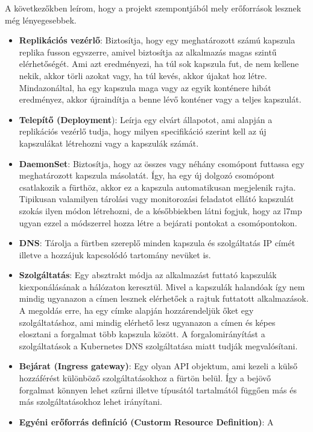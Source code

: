 A következőkben leírom, hogy a projekt szempontjából mely erőforrások lesznek még
lényegesebbek. 

\begin{itemize}
	\item \textbf{Replikációs vezérlő}: Biztosítja, hogy egy meghatározott számú 
	kapszula replika fusson egyszerre, amivel biztosítja az alkalmazás magas szintű
	elérhetőségét. Ami azt eredményezi, ha túl sok kapszula fut, de nem kellene nekik,
	akkor törli azokat vagy, ha túl kevés, akkor újakat hoz létre. Mindazonáltal, 
	ha egy kapszula maga vagy az egyik konténere hibát eredményez, akkor újraindítja
	a benne lévő konténer vagy a teljes kapszulát. 
	\item \textbf{Telepítő (Deployment}): Leírja egy elvárt állapotot, ami alapján a
	replikációs vezérlő tudja, hogy milyen specifikáció szerint kell az új kapszulákat
	létrehozni vagy a kapszulák számát. 
	\item \textbf{DaemonSet}: Biztosítja, hogy az összes vagy néhány csomópont 
	futtassa egy meghatározott kapszula másolatát. Így, ha egy új dolgozó csomópont 
	csatlakozik a fürthöz, akkor ez a kapszula automatikusan megjelenik rajta. Tipikusan
	valamilyen tárolási vagy monitorozási feladatot ellátó kapszulát szokás ilyen
	módon létrehozni, de a későbbiekben látni fogjuk, hogy az l7mp ugyan ezzel a 
	módszerrel hozza létre a bejárati pontokat a csomópontokon.
	\item \textbf{DNS}: Tárolja a fürtben szereplő minden kapszula és szolgáltatás
	IP címét illetve a hozzájuk kapcsolódó tartomány nevüket is.  
	\item \textbf{Szolgáltatás}: Egy absztrakt módja az alkalmazást futtató kapszulák
	kiexponálásának a hálózaton keresztül. Mivel a kapszulák halandóak így nem mindig
	ugyanazon a címen lesznek elérhetőek a rajtuk futtatott alkalmazások. A megoldás
	erre, ha egy címke alapján hozzárendeljük őket egy szolgáltatáshoz, ami mindig 
	elérhető lesz ugyanazon a címen és képes elosztani a forgalmat több kapszula között.
	A forgalomirányítást a szolgáltatások a Kubernetes DNS szolgáltatása miatt tudják 
	megvalósítani.  
	\item \textbf{Bejárat (Ingress gateway)}: Egy olyan API objektum, ami kezeli a 
	külső hozzáférést különböző szolgáltatásokhoz a fürtön belül. Így a bejövő forgalmat
	könnyen lehet szűrni illetve típusától tartalmától függően más és más szolgáltatásokhoz
	lehet irányítani. 
	\item \textbf{Egyéni erőforrás definíció (Custorm Resource Definition)}: A 

\end{itemize}
